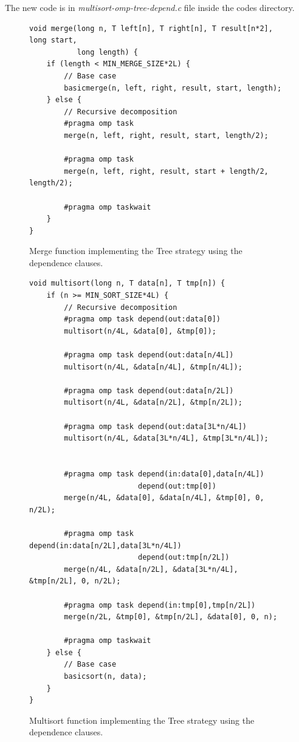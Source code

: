 \documentclass[12pt, a4paper]{article}
\begin{document}
The new code is in \textit{multisort-omp-tree-depend.c} file inside the codes directory.

\begin{figure}[H]
\begin{lstlisting}
void merge(long n, T left[n], T right[n], T result[n*2], long start,
		   long length) {
    if (length < MIN_MERGE_SIZE*2L) {
        // Base case
        basicmerge(n, left, right, result, start, length);
    } else {
        // Recursive decomposition
        #pragma omp task
        merge(n, left, right, result, start, length/2);
        
        #pragma omp task
        merge(n, left, right, result, start + length/2, length/2);
        
        #pragma omp taskwait
    }
}
\end{lstlisting}

\caption{Merge function implementing the Tree strategy using the dependence clauses.}
\end{figure}

\begin{figure}[H]
\begin{lstlisting}
void multisort(long n, T data[n], T tmp[n]) {
    if (n >= MIN_SORT_SIZE*4L) {
        // Recursive decomposition
		#pragma omp task depend(out:data[0])
		multisort(n/4L, &data[0], &tmp[0]);
		
		#pragma omp task depend(out:data[n/4L])
		multisort(n/4L, &data[n/4L], &tmp[n/4L]);
		
		#pragma omp task depend(out:data[n/2L])
		multisort(n/4L, &data[n/2L], &tmp[n/2L]);
		
		#pragma omp task depend(out:data[3L*n/4L])
		multisort(n/4L, &data[3L*n/4L], &tmp[3L*n/4L]);

		
		#pragma omp task depend(in:data[0],data[n/4L]) 
						 depend(out:tmp[0])
		merge(n/4L, &data[0], &data[n/4L], &tmp[0], 0, n/2L);
		
		#pragma omp task depend(in:data[n/2L],data[3L*n/4L])
						 depend(out:tmp[n/2L])
		merge(n/4L, &data[n/2L], &data[3L*n/4L], &tmp[n/2L], 0, n/2L);
		
		#pragma omp task depend(in:tmp[0],tmp[n/2L])
        merge(n/2L, &tmp[0], &tmp[n/2L], &data[0], 0, n);
        
        #pragma omp taskwait
	} else {
		// Base case
		basicsort(n, data);
	}
}
\end{lstlisting}

\caption{Multisort function implementing the Tree strategy using the dependence clauses.}
\end{figure}
\end{document}
